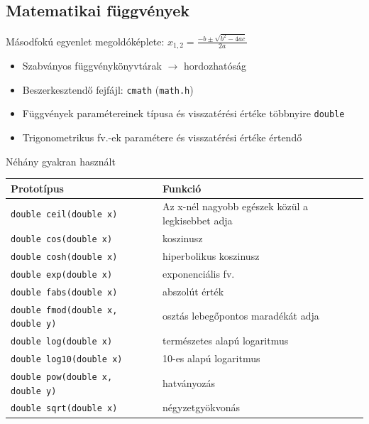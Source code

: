 \documentclass[usenames,dvipsnames,aspectratio=169]{beamer}
\begin{document}
\subsection{Matematikai függvények}
\begin{frame}
  \begin{exampleblock}{ Másodfokú egyenlet megoldóképlete: $x_{1,2} = \frac{-b\pm\sqrt{b^2 - 4ac}}{2a}$}
    \tiny
    \vspace{-.2cm}
    
    \vspace{-.2cm}
  \end{exampleblock}
\end{frame}

\begin{frame}
  \begin{itemize}
    \item Szabványos függvénykönyvtárak $\to$ hordozhatóság
    \item Beszerkesztendő fejfájl: \texttt{cmath} (\texttt{math.h})
    \item Függvények paramétereinek típusa és visszatérési értéke többnyire \texttt{double}
    \item Trigonometrikus fv.-ek paramétere és visszatérési értéke  értendő
  \end{itemize}
\end{frame}

\begin{frame}
  Néhány gyakran használt 
  \vfill
  \footnotesize
  \begin{tabular}{p{}p{}}
    Prototípus & Funkció\\ \hline
    \texttt{double ceil(double x)} & Az x-nél nagyobb egészek közül a legkisebbet adja\\
    \texttt{double cos(double x)} & koszinusz\\
    \texttt{double cosh(double x)} & hiperbolikus koszinusz\\
    \texttt{double exp(double x)} & exponenciális fv.\\
    \texttt{double fabs(double x)} & abszolút érték\\
    \texttt{double fmod(double x, double~y)} & osztás lebegőpontos maradékát adja\\
    \texttt{double log(double x)} & természetes alapú logaritmus\\
    \texttt{double log10(double x)} & 10-es alapú logaritmus\\
    \texttt{double pow(double x, double~y)} & hatványozás\\
    \texttt{double sqrt(double x)} & négyzetgyökvonás
  \end{tabular}
\end{frame}
\end{document}
